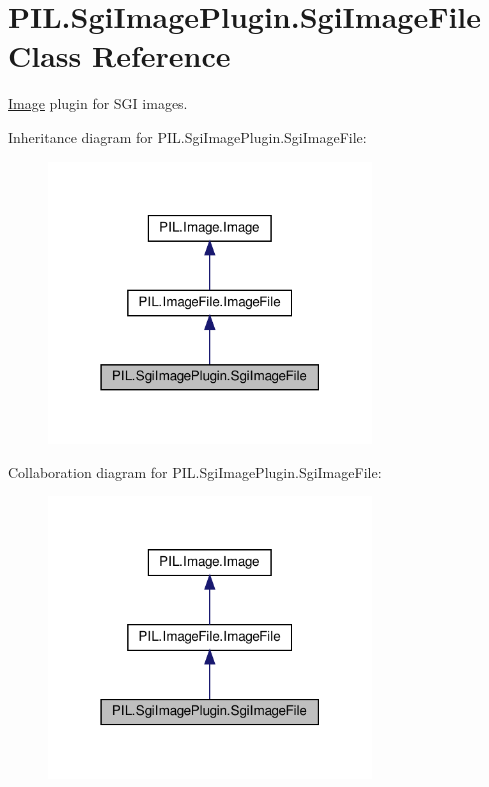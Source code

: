 \hypertarget{classPIL_1_1SgiImagePlugin_1_1SgiImageFile}{}\section{P\+I\+L.\+Sgi\+Image\+Plugin.\+Sgi\+Image\+File Class Reference}
\label{classPIL_1_1SgiImagePlugin_1_1SgiImageFile}


\hyperlink{namespacePIL_1_1Image}{Image} plugin for S\+GI images.  




Inheritance diagram for P\+I\+L.\+Sgi\+Image\+Plugin.\+Sgi\+Image\+File\+:
\nopagebreak
\begin{figure}[H]
\begin{center}
\leavevmode
\includegraphics[width=243pt]{classPIL_1_1SgiImagePlugin_1_1SgiImageFile__inherit__graph}
\end{center}
\end{figure}


Collaboration diagram for P\+I\+L.\+Sgi\+Image\+Plugin.\+Sgi\+Image\+File\+:
\nopagebreak
\begin{figure}[H]
\begin{center}
\leavevmode
\includegraphics[width=243pt]{classPIL_1_1SgiImagePlugin_1_1SgiImageFile__coll__graph}
\end{center}
\end{figure}
